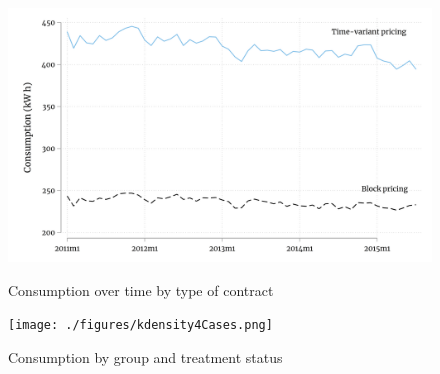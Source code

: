 \begin{figure}[ht]
  \caption{Consumption over time by type of contract}\label{fig:six}
  \begin{center}
  {\includegraphics[width=1\textwidth]{./figures/timeSeriesPlot.png}}
  \end{center}
\end{figure}

\FloatBarrier

\begin{figure}[ht]
  \caption{Consumption by group and treatment status}\label{fig:seven}
  \begin{center}
  {\texttt{[image: ./figures/kdensity4Cases.png]}}
  \end{center}
\end{figure}

\FloatBarrier
